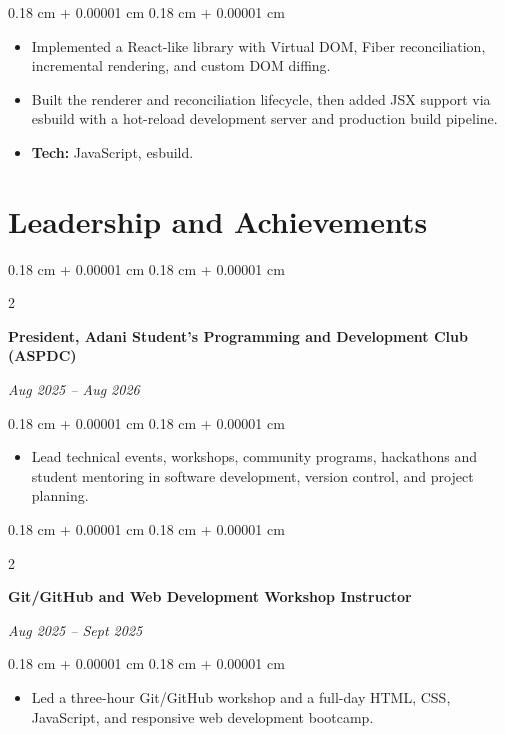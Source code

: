 \documentclass[10pt, letterpaper]{article}
\newenvironment{highlights}{
    \begin{itemize}[
        topsep=0.09 cm,
        parsep=0.09 cm,
        partopsep=0pt,
        itemsep=0pt,
        leftmargin=0.4 cm + 10pt
    ]
}{
    \end{itemize}
} %
\newenvironment{onecolentry}{
    \begin{adjustwidth}{
        0.18 cm + 0.00001 cm
    }{
        0.18 cm + 0.00001 cm
    }
}{
    \end{adjustwidth}
} %
\newenvironment{twocolentry}[2][]{
    \onecolentry
    \def\secondColumn{#2}
    \setcolumnwidth{\fill, 4.5 cm}
    \begin{paracol}{2}
}{
    \switchcolumn \raggedleft \secondColumn
    \end{paracol}
    \endonecolentry
} %
\begin{document}
\vspace{0.02 cm}
\begin{onecolentry}
    \begin{highlights}
        \item Implemented a React-like library with Virtual DOM, Fiber reconciliation, incremental rendering, and custom DOM diffing.
        \item Built the renderer and reconciliation lifecycle, then added JSX support via esbuild with a hot-reload development server and production build pipeline.
        \item \textbf{Tech:} JavaScript, esbuild.
    \end{highlights}
\end{onecolentry}

\vspace{0.05 cm}

    
\section{Leadership and Achievements}

\begin{twocolentry}{
\textit{Aug 2025 -- Aug 2026}}
\textbf{President, Adani Student's Programming and Development Club (ASPDC)}
\end{twocolentry}

\vspace{0.02 cm}
\begin{onecolentry}
    \begin{highlights}
        \item Lead technical events, workshops, community programs, hackathons and student mentoring in software development, version control, and project planning.
    \end{highlights}
\end{onecolentry}

\vspace{0.05 cm}

\begin{twocolentry}{
\textit{Aug 2025 -- Sept 2025}}
\textbf{Git/GitHub and Web Development Workshop Instructor}
\end{twocolentry}

\vspace{0.02 cm}
\begin{onecolentry}
    \begin{highlights}
        \item Led a three-hour Git/GitHub workshop and a full-day HTML, CSS, JavaScript, and responsive web development bootcamp.
    \end{highlights}
\end{onecolentry}
\end{document}
